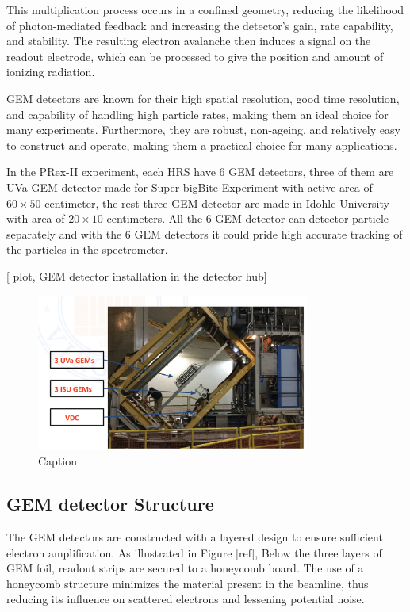 This multiplication process occurs in a confined geometry, reducing the likelihood of photon-mediated feedback and increasing the detector's gain, rate capability, and stability. The resulting electron avalanche then induces a signal on the readout electrode, which can be processed to give the position and amount of ionizing radiation.

GEM detectors are known for their high spatial resolution, good time resolution, and capability of handling high particle rates, making them an ideal choice for many experiments. Furthermore, they are robust, non-ageing, and relatively easy to construct and operate, making them a practical choice for many applications.

In the PRex-II experiment, each HRS have 6 GEM detectors, three of them are UVa GEM detector made for Super bigBite Experiment with active area of $60\times 50$ centimeter, the rest three GEM detector are made in Idohle University with area of $20 \times 10$ centimeters. All the 6 GEM detector can detector particle separately and with the 6 GEM detectors it could pride high accurate tracking of the particles in the spectrometer.  

[ plot, GEM detector installation in the detector hub]
\begin{figure}
    \centering
    \includegraphics[width=0.8\textwidth]{images/chap3/gem_in_hrs.png}
    \caption{Caption}
    \label{fig:enter-label}
\end{figure}

\subsection{GEM detector Structure}

The GEM detectors are constructed with a layered design to ensure sufficient electron amplification. As illustrated in Figure [ref], Below the three layers of GEM foil, readout strips are secured to a honeycomb board. The use of a honeycomb structure minimizes the material present in the beamline, thus reducing its influence on scattered electrons and lessening potential noise.

